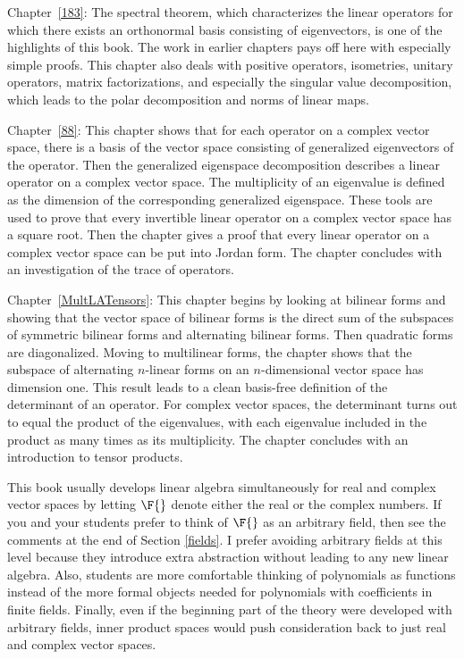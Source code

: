 {\begin{Itemize}
\item
Chapter~\ref{183}: The spectral theorem, which characterizes the linear operators for which there exists an orthonormal basis consisting of eigenvectors, is one of the highlights of this book.  The work in earlier chapters pays off here with especially simple proofs.  This chapter also deals with positive operators, isometries, unitary operators, matrix factorizations, and especially the singular value decomposition, which leads to the polar decomposition and norms of linear maps.

\item
Chapter~\ref{88}: This chapter shows that for each operator on a complex vector space, there is a basis of the vector space consisting of generalized eigenvectors of the operator. Then the generalized eigenspace decomposition describes a linear operator on  a complex vector space. The multiplicity of an eigenvalue is defined as the dimension of the corresponding generalized eigenspace. These tools are used to prove that every invertible linear operator on a complex vector space has a square root. Then the chapter gives a proof that every linear operator on a complex vector space can be put into Jordan form. The chapter concludes with an investigation of the trace of operators.

\item
Chapter~\ref{MultLATensors}: This chapter begins by looking at bilinear forms and showing that the vector space of bilinear forms is the direct sum of the subspaces of symmetric bilinear forms and alternating bilinear forms. Then quadratic forms are diagonalized. Moving to multilinear forms, the chapter shows that the subspace of alternating $n$-linear forms on an $n$-dimensional vector space has dimension one. This result leads to a clean basis-free definition of the determinant of an operator. For complex vector spaces, the determinant turns out to equal the product of the eigenvalues, with each eigenvalue included in the product as many times as its multiplicity. The chapter concludes with an introduction to tensor products.

\end{Itemize}

This book usually develops linear algebra simultaneously for real and
complex vector spaces by letting $\F{}$ denote either the real or the
complex numbers. If you and your students prefer to think of $\F{}$ as an arbitrary field, then see the comments at the end of Section \ref{fields}. I prefer avoiding arbitrary fields at this level because they  introduce extra abstraction without leading to any new linear
algebra.  Also, students are more comfortable thinking of polynomials as
functions instead of the more formal objects needed for polynomials
with coefficients in finite fields.  Finally, even if the beginning
part of the theory were developed with arbitrary fields, inner product
spaces would push consideration back to just real and complex vector
spaces.

}

